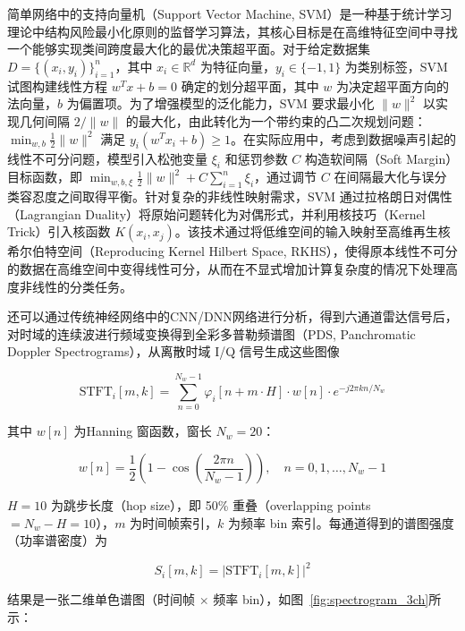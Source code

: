 简单网络中的支持向量机（Support Vector Machine, SVM）是一种基于统计学习理论中结构风险最小化原则的监督学习算法，其核心目标是在高维特征空间中寻找一个能够实现类间跨度最大化的最优决策超平面。对于给定数据集 $D = \{(x_{i}, y_{i})\}_{i=1}^{n}$，其中 $x_{i} \in \mathbb{R}^{d}$ 为特征向量，$y_{i} \in \{-1, 1\}$ 为类别标签，SVM 试图构建线性方程 $w^{T}x + b = 0$ 确定的划分超平面，其中 $w$ 为决定超平面方向的法向量，$b$ 为偏置项。为了增强模型的泛化能力，SVM 要求最小化 $\|w\|^{2}$ 以实现几何间隔 $2/\|w\|$ 的最大化，由此转化为一个带约束的凸二次规划问题：$\min_{w,b}\frac{1}{2}\|w\|^{2}$ 满足 $y_{i}(w^{T}x_{i} + b) \geq 1$。在实际应用中，考虑到数据噪声引起的线性不可分问题，模型引入松弛变量 $\xi_{i}$ 和惩罚参数 $C$ 构造软间隔（Soft Margin）目标函数，即 $\min_{w,b,\xi}\frac{1}{2}\|w\|^{2} + C\sum_{i=1}^{n}\xi_{i}$，通过调节 $C$ 在间隔最大化与误分类容忍度之间取得平衡。针对复杂的非线性映射需求，SVM 通过拉格朗日对偶性（Lagrangian Duality）将原始问题转化为对偶形式，并利用核技巧（Kernel Trick）引入核函数 $K(x_{i}, x_{j})$。该技术通过将低维空间的输入映射至高维再生核希尔伯特空间（Reproducing Kernel Hilbert Space, RKHS），使得原本线性不可分的数据在高维空间中变得线性可分，从而在不显式增加计算复杂度的情况下处理高度非线性的分类任务。

还可以通过传统神经网络中的CNN/DNN网络进行分析，得到六通道雷达信号后，对时域的连续波进行频域变换得到全彩多普勒频谱图（PDS, Panchromatic Doppler Spectrograms），从离散时域 I/Q 信号生成这些图像

\begin{equation}
    \mathrm{STFT}_{i}[m,k] = \sum_{n=0}^{N_{w}-1}\varphi_{i}[n + m \cdot H] \cdot w[n] \cdot e^{-j2\pi kn/N_{w}}
\end{equation}

其中 $w[n]$ 为Hanning 窗函数，窗长 $N_{w} = 20$：

\begin{equation}
    w[n] = \frac{1}{2}\left(1 - \cos\left(\frac{2\pi n}{N_{w}-1}\right)\right), \quad n = 0, 1, \ldots, N_{w}-1
\end{equation}

$H = 10$ 为跳步长度（hop size），即 50\% 重叠（overlapping points $= N_{w} - H = 10$），$m$ 为时间帧索引，$k$ 为频率 bin 索引。每通道得到的谱图强度（功率谱密度）为

\begin{equation}
    S_{i}[m,k] = |\mathrm{STFT}_{i}[m,k]|^{2}
\end{equation}

结果是一张二维单色谱图（时间帧 $\times$ 频率 bin），如图~\ref{fig:spectrogram_3ch}所示：

